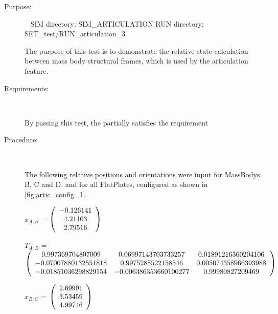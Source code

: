 \label{test:art_test_3}

\begin{description}

\item[Purpose:] \ \newline
SIM directory: SIM\_ARTICULATION
RUN directory: SET\_test/RUN\_articulation\_3

The purpose of this test is to demonstrate the relative state calculation
between mass body structural frames, which is used by the articulation
feature.

\item[Requirements:] \ \newline

By passing this test, the \ModelDesc partially satisfies
the requirement 

\item[Procedure:] \ \newline

The following relative positions and orientations were input for MassBodys
B, C and D, and for all FlatPlates, configured as shown in
\ref{fig:artic_config_1}.

$x_{A:B}$ = $\left( \begin{array} {ccc}  -0.126141 \\    4.21103 \\    2.79516
\end{array} \right)\\ \\$

$T_{A:B}$ = $\left( \begin{array} {ccc} 
   0.997369704807009 & 0.06997143703733257 & 0.01891216360204106 \\
   -0.07007880132551818 & 0.9975285522158546 & 0.005074358966393988 \\
   -0.01851036298829154 & -0.006386353660100277 & 0.99980827209469 \\
\end{array} \right)\\ \\$
             
$x_{B:C}$ = $\left( \begin{array} {ccc}    2.69991 \\    3.53459 \\    4.99746
\end{array} \right)\\ \\$


\end{description}
